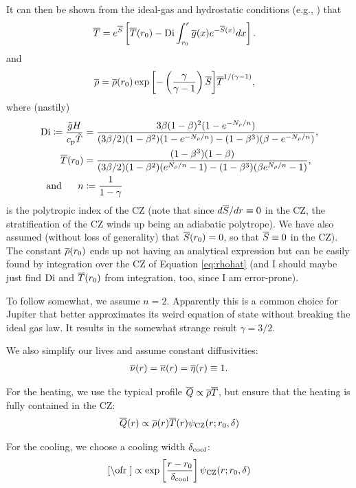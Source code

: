\documentclass[12pt]{article}
\numberwithin{equation}{section}
\newcommand{\cz}{_{\rm{CZ}}}
\newcommand{\dcool}{\delta_{\rm{cool}}}
\begin{document}
It can then be shown from the ideal-gas and hydrostatic conditions (e.g., \citealt{Matilsky2023d}) that
\begin{align}\label{eq:tmphat}
	\overline{T} &= e^{\overline{S}}\left[\overline{T}(r_0) - {\rm{Di}}\int_{r_0}^r \overline{g}(x)  e^{-\overline{S}(x)}dx\right].
\end{align}
and
\begin{align}\label{eq:rhohat}
	\overline{\rho} &= \overline{\rho}(r_0) \exp{\left[-\left(\frac{\gamma}{\gamma-1}\right)\overline{S}\right]}\overline{T}^{1/(\gamma-1)},
\end{align}
where (nastily)
\begin{align}\label{eq:digory}
	{\rm{Di}} \coloneqq \frac{\tilde{g}H}{c_{\rm{p}}\tilde{T}} &=  \frac{3 \beta (1 - \beta)^2 (1 - e^{-N_\rho/n})} 
	{ (3\beta/2) (1 - \beta^2) (1 - e^{-N_\rho/n}) - (1-\beta^3)(\beta-e^{-N_\rho/n})},\\
	\overline{T}(r_0)&= \frac{(1-\beta^3)(1-\beta)}{(3\beta/2)(1-\beta^2)(e^{N_\rho/n}-1) - (1-\beta^3)(\beta e^{N_\rho/n}-1)},\\
	\text{and}\ \ \ \ \  n &\coloneqq \frac{1}{1-\gamma}
\end{align}
is the polytropic index of the CZ (note that since $d\overline{S}/dr\equiv0$ in the CZ, the stratification of the CZ winds up being an adiabatic polytrope). We have also assumed (without loss of generality) that $\overline{S}(r_0)=0$, so that $\overline{S}\equiv0$ in the CZ). The constant $\overline{\rho}(r_0)$ ends up not having an analytical expression but can be easily found by integration over the CZ of Equation \eqref{eq:rhohat} (and I should maybe just find ${\rm{Di}}$ and $\overline{T}(r_0)$ from integration, too, since I am error-prone).  

To follow \citet{Jones2011} \citet{Heimpel2022} somewhat, we assume $n=2$. Apparently this is a common choice for Jupiter that better approximates its weird equation of state without breaking the ideal gas law. It results in the somewhat strange result $\gamma=3/2$. 

We also simplify our lives and assume constant diffusivities:
\begin{align}
	\overline{\nu}(r)=\overline{\kappa}(r)=\overline{\eta}(r)\equiv 1.
\end{align}

For the heating, we use the typical {\rayleigh} profile $\overline{Q}\propto \overline{\rho} \overline{T}$, but ensure that the heating is fully contained in the CZ:
\begin{align}
	\qref\ofr \propto \rhoref\ofr\tmpref\ofr \psi\cz(r; r_0,\delta)
\end{align} 

For the cooling, we choose a cooling width $\dcool$:
\begin{align}
	\cref\ofr \propto \exp\left[\frac{r-r_0}{\dcool}\right] \psi\cz(r; r_0,\delta)
\end{align}
\end{document}
